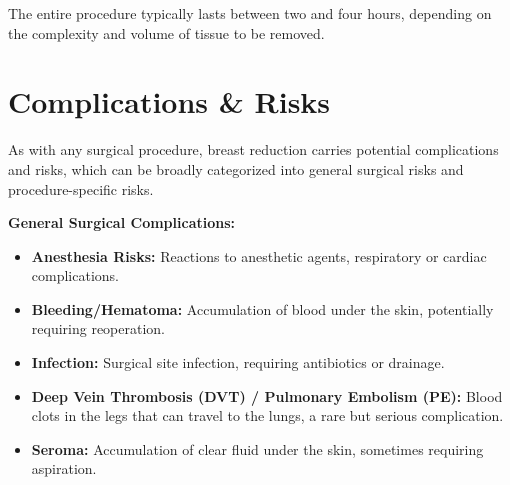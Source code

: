The entire procedure typically lasts between two and four hours, depending on the complexity and volume of tissue to be removed.

\section*{Complications \& Risks}
As with any surgical procedure, breast reduction carries potential complications and risks, which can be broadly categorized into general surgical risks and procedure-specific risks.

\textbf{General Surgical Complications:}
\begin{itemize}
  \item \textbf{Anesthesia Risks:} Reactions to anesthetic agents, respiratory or cardiac complications.
  \item \textbf{Bleeding/Hematoma:} Accumulation of blood under the skin, potentially requiring reoperation.
  \item \textbf{Infection:} Surgical site infection, requiring antibiotics or drainage.
  \item \textbf{Deep Vein Thrombosis (DVT) / Pulmonary Embolism (PE):} Blood clots in the legs that can travel to the lungs, a rare but serious complication.
\item \textbf{Seroma:} Accumulation of clear fluid under the skin, sometimes requiring aspiration.
\end{itemize}

